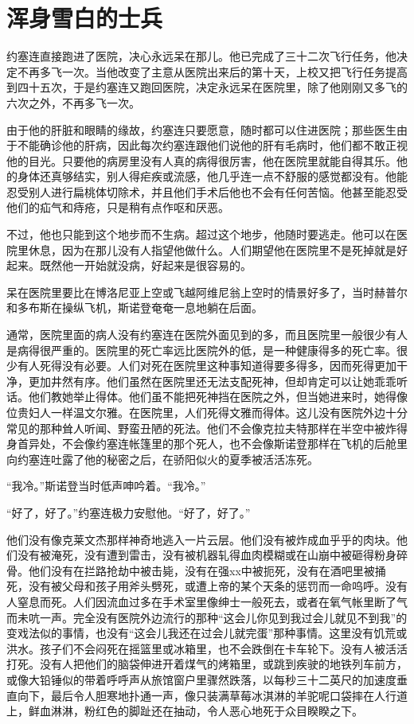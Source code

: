 \chapter{浑身雪白的士兵}
 
    约塞连直接跑进了医院，决心永远呆在那儿。他已完成了三十二次飞行任务，他决定不再多飞一次。当他改变了主意从医院出来后的第十天，上校又把飞行任务提高到四十五次，于是约塞连又跑回医院，决定永远呆在医院里，除了他刚刚又多飞的六次之外，不再多飞一次。

    由于他的肝脏和眼睛的缘故，约塞连只要愿意，随时都可以住进医院；那些医生由于不能确诊他的肝病，因此每次约塞连跟他们说他的肝有毛病时，他们都不敢正视他的目光。只要他的病房里没有人真的病得很厉害，他在医院里就能自得其乐。他的身体还真够结实，别人得疟疾或流感，他几乎连一点不舒服的感觉都没有。他能忍受别人进行扁桃体切除术，并且他们手术后他也不会有任何苦恼。他甚至能忍受他们的疝气和痔疮，只是稍有点作呕和厌恶。

    不过，他也只能到这个地步而不生病。超过这个地步，他随时要逃走。他可以在医院里休息，因为在那儿没有人指望他做什么。人们期望他在医院里不是死掉就是好起来。既然他一开始就没病，好起来是很容易的。

    呆在医院里要比在博洛尼亚上空或飞越阿维尼翁上空时的情景好多了，当时赫普尔和多布斯在操纵飞机，斯诺登奄奄一息地躺在后面。

    通常，医院里面的病人没有约塞连在医院外面见到的多，而且医院里一般很少有人是病得很严重的。医院里的死亡率远比医院外的低，是一种健康得多的死亡率。很少有人死得没有必要。人们对死在医院里这种事知道得要多得多，因而死得更加干净，更加井然有序。他们虽然在医院里还无法支配死神，但却肯定可以让她乖乖听话。他们教她举止得体。他们虽不能把死神挡在医院之外，但当她进来时，她得像位贵妇人一样温文尔雅。在医院里，人们死得文雅而得体。这儿没有医院外边十分常见的那种耸人听闻、野蛮丑陋的死法。他们不会像克拉夫特那样在半空中被炸得身首异处，不会像约塞连帐篷里的那个死人，也不会像斯诺登那样在飞机的后舱里向约塞连吐露了他的秘密之后，在骄阳似火的夏季被活活冻死。

    “我冷。”斯诺登当时低声呻吟着。“我冷。”

    “好了，好了。”约塞连极力安慰他。“好了，好了。”

    他们没有像克莱文杰那样神奇地逃入一片云层。他们没有被炸成血乎乎的肉块。他们没有被淹死，没有遭到雷击，没有被机器轧得血肉模糊或在山崩中被砸得粉身碎骨。他们没有在拦路抢劫中被击毙，没有在强xx中被扼死，没有在酒吧里被捅死，没有被父母和孩子用斧头劈死，或遭上帝的某个天条的惩罚而一命呜呼。没有人窒息而死。人们因流血过多在手术室里像绅士一般死去，或者在氧气帐里断了气而未吭一声。完全没有医院外边流行的那种“这会儿你见到我过会儿就见不到我”的变戏法似的事情，也没有“这会儿我还在过会儿就完蛋”那种事情。这里没有饥荒或洪水。孩子们不会闷死在摇篮里或冰箱里，也不会跌倒在卡车轮下。没有人被活活打死。没有人把他们的脑袋伸进开着煤气的烤箱里，或跳到疾驶的地铁列车前方，或像大铅锤似的带着呼呼声从旅馆窗户里骤然跌落，以每秒三十二英尺的加速度垂直向下，最后令人胆寒地扑通一声，像只装满草莓冰淇淋的羊驼呢口袋摔在人行道上，鲜血淋淋，粉红色的脚趾还在抽动，令人恶心地死于众目睽睽之下。

